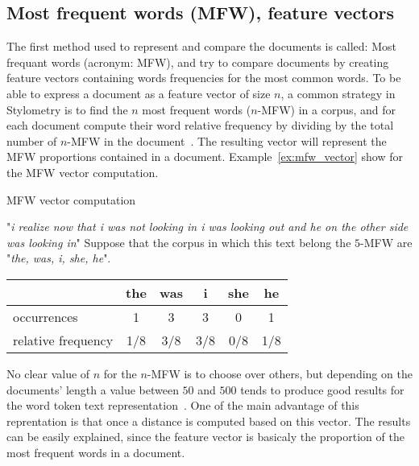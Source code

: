 \subsection{Most frequent words (MFW), feature vectors}

The first method used to represent and compare the documents is called: Most frequant words (acronym: MFW), and try to compare documents by creating feature vectors containing words frequencies for the most common words.
To be able to express a document as a feature vector of size $n$, a common strategy in Stylometry is to find the $n$ most frequent words ($n$-MFW) in a corpus, and for each document compute their word relative frequency by dividing by the total number of $n$-MFW in the document~\cite{savoy_stylo}.
The resulting vector will represent the MFW proportions contained in a document.
Example~\ref{ex:mfw_vector} show for the MFW vector computation.

\begin{example}
  \caption{MFW vector computation}
  \label{ex:mfw_vector}

  \begin{subexample}
    "\textit{i realize now that i was not looking in i was looking out and he on the other side was looking in}"\cite{ddlc}
    Suppose that the corpus in which this text belong the $5$-MFW are "\textit{the, was, i, she, he}".
  \end{subexample}

  \begin{subexample}
    \centering
    \begin{tabular}{l c c c c c}
      \toprule
                         & the & was & i   & she & he  \\
      \midrule
      occurrences         & 1   & 3   & 3   & 0   & 1   \\
      relative frequency & 1/8 & 3/8 & 3/8 & 0/8 & 1/8 \\
      \bottomrule
    \end{tabular}
  \end{subexample}
\end{example}

No clear value of $n$ for the $n$-MFW is to choose over others, but depending on the documents' length a value between $50$ and $500$ tends to produce good results for the word token text representation~\cite{savoy_text_representation}.
One of the main advantage of this reprentation is that once a distance is computed based on this vector. The results can be easily explained, since the feature vector is basicaly the proportion of the most frequent words in a document.

